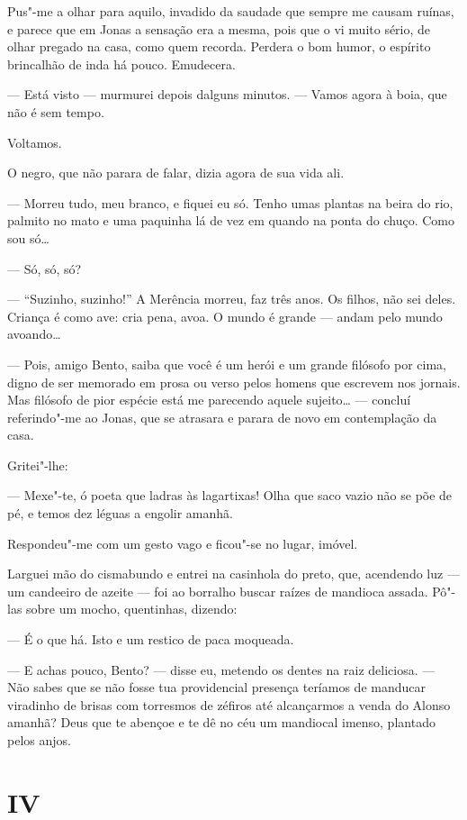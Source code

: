 Pus"-me a olhar para aquilo, invadido da saudade que sempre me causam
ruínas, e parece que em Jonas a sensação era a mesma, pois que o vi
muito sério, de olhar pregado na casa, como quem recorda. Perdera o bom
humor, o espírito brincalhão de inda há pouco. Emudecera.

--- Está visto --- murmurei depois dalguns minutos. --- Vamos agora à
boia, que não é sem tempo.

Voltamos.

O negro, que não parara de falar, dizia agora de sua vida ali.

--- Morreu tudo, meu branco, e fiquei eu só. Tenho umas plantas na beira
do rio, palmito no mato e uma paquinha lá de vez em quando na ponta do
chuço. Como sou só\ldots{}

--- Só, só, só?

--- ``Suzinho, suzinho!'' A Merência morreu, faz três anos. Os filhos,
não sei deles. Criança é como ave: cria pena, avoa. O mundo é grande ---
andam pelo mundo avoando\ldots{}

--- Pois, amigo Bento, saiba que você é um herói e um grande filósofo
por cima, digno de ser memorado em prosa ou verso pelos homens que
escrevem nos jornais. Mas filósofo de pior espécie está me parecendo
aquele sujeito\ldots{} --- concluí referindo"-me ao Jonas, que se atrasara e
parara de novo em contemplação da casa.

Gritei"-lhe:

--- Mexe"-te, ó poeta que ladras às lagartixas! Olha que saco vazio não
se põe de pé, e temos dez léguas a engolir amanhã.

Respondeu"-me com um gesto vago e ficou"-se no lugar, imóvel.

Larguei mão do cismabundo e entrei na casinhola do preto, que, acendendo
luz --- um candeeiro de azeite --- foi ao borralho buscar raízes de
mandioca assada. Pô"-las sobre um mocho, quentinhas, dizendo:

--- É o que há. Isto e um restico de paca moqueada.

--- E achas pouco, Bento? --- disse eu, metendo os dentes na raiz
deliciosa. --- Não sabes que se não fosse tua providencial presença
teríamos de manducar viradinho de brisas com torresmos de zéfiros até
alcançarmos a venda do Alonso amanhã? Deus que te abençoe e te dê no céu
um mandiocal imenso, plantado pelos anjos.

\section*{IV}

